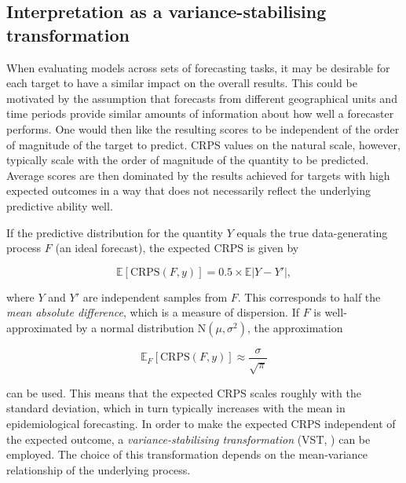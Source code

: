 \documentclass[10pt,letterpaper]{article}
\begin{document}
\subsection*{Interpretation as a variance-stabilising transformation}
\label{sec:methods:vst}

When evaluating models across sets of forecasting tasks, it may be desirable for each target to have a similar impact on the overall results. This could be motivated by the assumption that forecasts from different geographical units and time periods provide similar amounts of information about how well a forecaster performs. One would then like the resulting scores to be independent of the order of magnitude of the target to predict. CRPS values on the natural scale, however, typically scale with the order of magnitude of the quantity to be predicted. Average scores are then dominated by the results achieved for targets with high expected outcomes in a way that does not necessarily reflect the underlying predictive ability well.

If the predictive distribution for the quantity $Y$ equals the true data-generating process $F$ (an ideal forecast), the expected CRPS is given by \cite{gneitingStrictlyProperScoring2007}
\begin{linenomath*}
\begin{equation}
\mathbb{E}[\text{CRPS}(F, y)] = 0.5\times\mathbb{E}|Y - Y'|,
\end{equation}
\end{linenomath*}
where $Y$ and $Y'$ are independent samples from $F$. This corresponds to half the \textit{mean absolute difference}, which is a measure of dispersion. If $F$ is well-approximated by a normal distribution $\text{N}(\mu, \sigma^2)$, the approximation
\begin{linenomath*}
\begin{equation}
\mathbb{E}_F[\text{CRPS}(F, y)] \approx \frac{\sigma}{\sqrt{\pi}}
\end{equation}
\end{linenomath*}
can be used. This means that the expected CRPS scales roughly with the standard deviation, which in turn typically increases with the mean in epidemiological forecasting. In order to make the expected CRPS independent of the expected outcome, a \textit{variance-stabilising transformation} (VST, \cite{bartlettSquareRootTransformation1936, dunnGeneralizedLinearModels2018}) can be employed. The choice of this transformation depends on the mean-variance relationship of the underlying process. 
\end{document}
